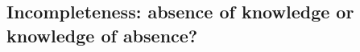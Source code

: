 \documentclass[french, english]{llncs}
\begin{document}
	\subsection{Incompleteness: absence of knowledge or knowledge of absence?}
%	
%	
%	
%	
%	
%	
%	
%	
	

\end{document}
